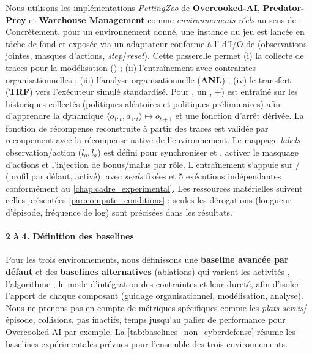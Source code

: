 Nous utilisons les implémentations \emph{PettingZoo} de \phantom{X} \textbf{Overcooked-AI}, \textbf{Predator-Prey} et \textbf{Warehouse Management} comme \emph{environnements réels} au sens de . Concrètement, pour un environnement donné, une instance du jeu est lancée en tâche de fond et exposée via un adaptateur  conforme à l' d'I/O de  (observations jointes, masques d'actions, \emph{step}/\emph{reset}). Cette passerelle permet (i) la collecte de traces pour la modélisation () ; (ii) l'entraînement  avec contraintes organisationnelles ; (iii) l'analyse organisationnelle (\textbf{ANL}) ; (iv) le transfert (\textbf{TRF}) vers l'exécuteur simulé standardisé.
Pour , un , +) est entraîné sur les historiques collectés (politiques aléatoires et politiques préliminaires) afin d'apprendre la dynamique $\langle o_{1:t},a_{1:t} \rangle \mapsto o_{t+1}$ et une fonction d'arrêt dérivée. La fonction de récompense reconstruite à partir des traces est validée par recoupement avec la récompense native de l'environnement. Le mappage \emph{labels} observation/action ($l_o, l_a$) est défini pour synchroniser  et , activer le masquage d'actions et l'injection de bonus/malus par rôle. L'entraînement s'appuie sur / (profil  par défaut,  activé), avec \textit{seeds} fixées et 5 exécutions indépendantes conformément au \autoref{chap:cadre_experimental}. Les ressources matérielles suivent celles présentées \autoref{par:compute_conditions} ; seules les dérogations (longueur d'épisode, fréquence de log) sont précisées dans les résultats.

\paragraph{2 à 4. Définition des baselines}

Pour les trois environnements, nous définissons une \textbf{baseline avancée par défaut} et des \textbf{baselines alternatives} (ablations) qui varient les activités , l'algorithme , le mode d'intégration des contraintes et leur dureté, afin d'isoler l'apport de chaque composant (guidage organisationnel, modélisation, analyse). Nous ne prenons pas en compte de métriques spécifiques comme les \emph{plats servis}/épisode, collisions, pas inactifs, temps jusqu'au palier de performance pour Overcooked-AI par exemple. La \autoref{tab:baselines_non_cyberdefense} résume les baselines expérimentales prévues pour l'ensemble des trois environnements.


